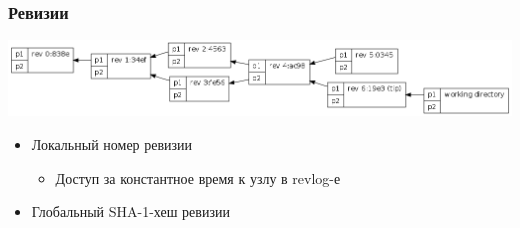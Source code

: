 \documentclass{../mcsslides}
\begin{document}
    \begin{frame}
        \frametitle{Ревизии}
        \begin{center}
            \includegraphics[width=\textwidth]{mercurialRevisions.png}
        \end{center}
        \begin{itemize}
            \item Локальный номер ревизии
            \begin{itemize}
                \item Доступ за константное время к узлу в revlog-е
            \end{itemize}
            \item Глобальный SHA-1-хеш ревизии
        \end{itemize}
    \end{frame}
\end{document}
